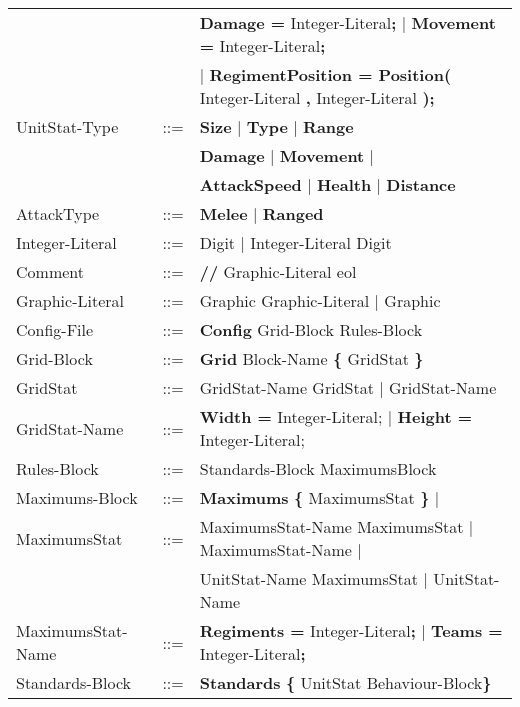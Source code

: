 \begin{center}
\begin{longtable}{ l l l }
								   &	     & {\bf Damage =} Integer-Literal{\bf ;} $\mid$ {\bf Movement = }Integer-Literal{\bf ;} \\				  
								   &		 & $\mid$ {\bf RegimentPosition = Position(} Integer-Literal {\bf ,} Integer-Literal {\bf );}\\
				UnitStat-Type	   &	::=	 & {\bf Size} $\mid$ {\bf Type} $\mid$ {\bf  Range} \\
								   &	     & {\bf Damage} $\mid$ {\bf Movement } $\mid$ \\
								   &		 & {\bf AttackSpeed} $\mid$ {\bf Health} $\mid$ {\bf Distance}\\
				AttackType		   &    ::=  & {\bf Melee} $\mid$ {\bf Ranged} \\
				Integer-Literal    &	::=  & Digit $\mid$ Integer-Literal Digit \\
				Comment			   &	::=	 & {\bf //} Graphic-Literal eol \\
				Graphic-Literal	   &	::=	 & Graphic Graphic-Literal $\mid$ Graphic \\
				Config-File		   & 	::=  & {\bf Config} Grid-Block Rules-Block  		\\
				Grid-Block		   &	::=	 & {\bf Grid} Block-Name	 {\bf \{} GridStat \bf{\}} \\
				GridStat		   &	::=  & GridStat-Name GridStat $\mid$ GridStat-Name   \\
				GridStat-Name	   &	::=  & {\bf Width = } Integer-Literal; $\mid$ {\bf Height = } Integer-Literal; \\

				Rules-Block		   &	::=	 & Standards-Block MaximumsBlock 				\\
				Maximums-Block	   &	::=	 & {\bf Maximums} {\bf \{} MaximumsStat {\bf \}} $\mid$ \\
				MaximumsStat	   &	::=  & MaximumsStat-Name MaximumsStat $\mid$ MaximumsStat-Name $\mid$		\\
								   &	     & UnitStat-Name MaximumsStat $\mid$ UnitStat-Name			\\
				MaximumsStat-Name  &	::=  & {\bf Regiments = } Integer-Literal{\bf ;} $\mid$ {\bf Teams = } Integer-Literal{\bf ;} \\
				Standards-Block	   &    ::=  & {\bf Standards} {\bf \{ } UnitStat Behaviour-Block\bf{\} }		\\
				\end{longtable}
		\end{center}
		
